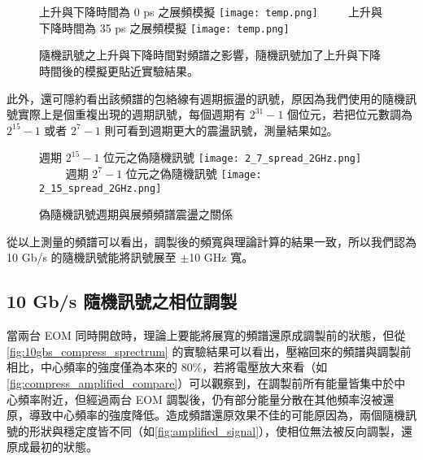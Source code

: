 \documentclass[class=NCU_thesis, crop=false]{standalone}
\begin{document}
\begin{figure}[!hbt]
    \centering
    \subcaptionbox
        {上升與下降時間為 0 ps 之展頻模擬
        \label{fig:subfig_fig1}}
        {\texttt{[image: temp.png]}}
    ~~~~
    \subcaptionbox
        {上升與下降時間為 35 ps 之展頻模擬
        \label{fig:subfig_fig2}}
        {\texttt{[image: temp.png]}}
    \caption{隨機訊號之上升與下降時間對頻譜之影響，隨機訊號加了上升與下降時間後的模擬更貼近實驗結果。}
    \label{fig:simulation_rising_falling}
\end{figure}


此外，還可隱約看出該頻譜的包絡線有週期振盪的訊號，原因為我們使用的隨機訊號實際上是個重複出現的週期訊號，每個週期有 $2^{31}-1$ 個位元，若把位元數調為 $2^{15}-1$ 或者 $2^{7}-1$ 則可看到週期更大的震盪訊號，測量結果如\cref{fig:different_length_PRBS}。

\begin{figure}[!hbt]
    \centering
    \subcaptionbox
        {週期 $2^{15}-1$ 位元之偽隨機訊號
        \label{fig:subfig_fig1}}
        {\texttt{[image: 2\_7\_spread\_2GHz.png]}}
    ~~~~
    \subcaptionbox
        {週期 $2^{7}-1$ 位元之偽隨機訊號
        \label{fig:subfig_fig2}}
        {\texttt{[image: 2\_15\_spread\_2GHz.png]}}
    \caption{偽隨機訊號週期與展頻頻譜震盪之關係}
    \label{fig:different_length_PRBS}
\end{figure}

從以上測量的頻譜可以看出，調製後的頻寬與理論計算的結果一致，所以我們認為 10 Gb/s 的隨機訊號能將訊號展至 $\pm$10 GHz 寬。

\subsection{10 Gb/s 隨機訊號之相位調製}

當兩台 EOM 同時開啟時，理論上要能將展寬的頻譜還原成調製前的狀態，但從\cref{fig:10gbs_compress_sprectrum} 的實驗結果可以看出，壓縮回來的頻譜與調製前相比，中心頻率的強度僅為本來的 80\%，若將電壓放大來看（如\cref{fig:compress_amplified_compare}）可以觀察到，在調製前所有能量皆集中於中心頻率附近，但經過兩台 EOM 調製後，仍有部分能量分散在其他頻率沒被還原，導致中心頻率的強度降低。造成頻譜還原效果不佳的可能原因為，兩個隨機訊號的形狀與穩定度皆不同（如\cref{fig:amplified_signal}），使相位無法被反向調製，還原成最初的狀態。
\end{document}
